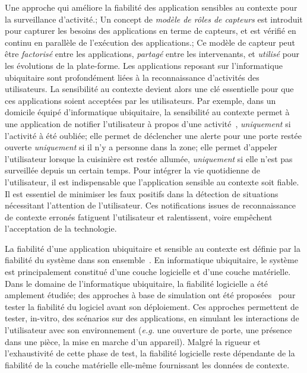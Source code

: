 {
  Une approche qui améliore la fiabilité des application sensibles au contexte pour la surveillance d'activité.;
  Un concept de {\em modèle de rôles de capteurs} est introduit pour capturer les besoins des applications en terme de capteurs, et est vérifié en continu en parallèle de l'exécution des applications.;
  Ce modèle de capteur peut être {\em factorisé} entre les applications, {\em partagé} entre les intervenants, et {\em utilisé} pour les évolutions de la plate-forme.
}
Les applications reposant sur l'informatique ubiquitaire sont profondément liées à la reconnaissance d'activités des utilisateurs. 
La sensibilité au contexte devient alors une clé essentielle pour que ces applications soient acceptées par les utilisateurs.
Par exemple, dans un domicile équipé d'informatique ubiquitaire, la sensibilité au contexte permet à une application de notifier l'utilisateur à propos d'une activité~\cite{CHAN-REVIEW-COMPUTER2008}, {\em uniquement} si l'activité à été oubliée; elle permet de déclencher une alerte pour une porte restée ouverte {\em uniquement} si il n'y a personne dans la zone; elle permet d'appeler l'utilisateur lorsque la cuisinière est restée allumée, {\em uniquement} si elle n'est pas surveillée depuis un certain temps.
Pour intégrer la vie quotidienne de l'utilisateur, il est indispensable que l'application sensible au contexte soit fiable. 
Il est essentiel de minimiser les faux positifs dans la détection de situations nécessitant l'attention de l'utilisateur. Ces notifications issues de reconnaissance de contexte erronés fatiguent l'utilisateur et ralentissent, voire empêchent l'acceptation de la technologie.

La fiabilité d'une application ubiquitaire et sensible au contexte est définie par la fiabilité du système dans son ensemble~\cite{STANKOVIC-OPPORTUNITIES-COMPUTER2005,MENNICKEN-FROM-UBICOMP2014}. En informatique ubiquitaire, le système est principalement constitué d'une couche logicielle et d'une couche matérielle. 
Dans le domaine de l'informatique ubiquitaire, la fiabilité logicielle a été amplement étudiée; des approches à base de simulation ont été proposées~\cite{BRUNO-DIASIM-MOBIQUITOUS2009} pour tester la fiabilité du logiciel avant son déploiement. Ces approches permettent de tester, in-vitro, des scénarios sur des applications, en simulant les interactions de l'utilisateur avec son environnement ({\em e.g.} une ouverture de porte, une présence dans une pièce, la mise en marche d'un appareil). Malgré la rigueur et l'exhaustivité de cette phase de test, la fiabilité logicielle reste dépendante de la fiabilité de la couche matérielle elle-même fournissant les données de contexte.


